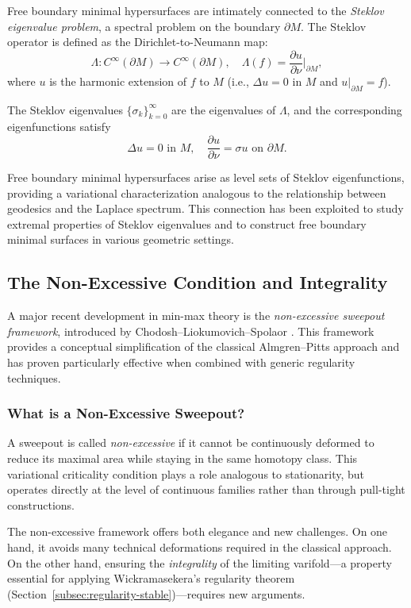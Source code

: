 Free boundary minimal hypersurfaces are intimately connected to the \emph{Steklov eigenvalue
problem}, a spectral problem on the boundary $\partial M$. The Steklov operator is defined as the
Dirichlet-to-Neumann map:
\[
    \Lambda: C^\infty(\partial M) \to C^\infty(\partial M), \quad
    \Lambda(f) = \frac{\partial u}{\partial \nu}\Big|_{\partial M},
\]
where $u$ is the harmonic extension of $f$ to $M$ (i.e., $\Delta u = 0$ in $M$ and $u|_{\partial M} = f$).

The Steklov eigenvalues $\{\sigma_k\}_{k=0}^\infty$ are the eigenvalues of $\Lambda$, and the
corresponding eigenfunctions satisfy
\[
    \Delta u = 0 \text{ in } M, \quad
    \frac{\partial u}{\partial \nu} = \sigma u \text{ on } \partial M.
\]

Free boundary minimal hypersurfaces arise as level sets of Steklov eigenfunctions, providing a
variational characterization analogous to the relationship between geodesics and the Laplace
spectrum. This connection has been exploited to study extremal properties of Steklov eigenvalues
and to construct free boundary minimal surfaces in various geometric settings.

\subsection{The Non-Excessive Condition and Integrality}\label{subsec:non-excessive-integrality}

A major recent development in min-max theory is the \emph{non-excessive sweepout framework},
introduced by Chodosh--Liokumovich--Spolaor \cite{CLS20}. This framework provides a conceptual
simplification of the classical Almgren--Pitts approach and has proven particularly effective when
combined with generic regularity techniques.

\subsubsection{What is a Non-Excessive Sweepout?}

A sweepout is called \emph{non-excessive} if it cannot be continuously deformed to reduce its
maximal area while staying in the same homotopy class. This variational criticality condition plays
a role analogous to stationarity, but operates directly at the level of continuous families rather
than through pull-tight constructions.

The non-excessive framework offers both elegance and new challenges. On one hand, it avoids many
technical deformations required in the classical approach. On the other hand, ensuring the
\emph{integrality} of the limiting varifold---a property essential for applying Wickramasekera's
regularity theorem (Section~\ref{subsec:regularity-stable})---requires new arguments.

